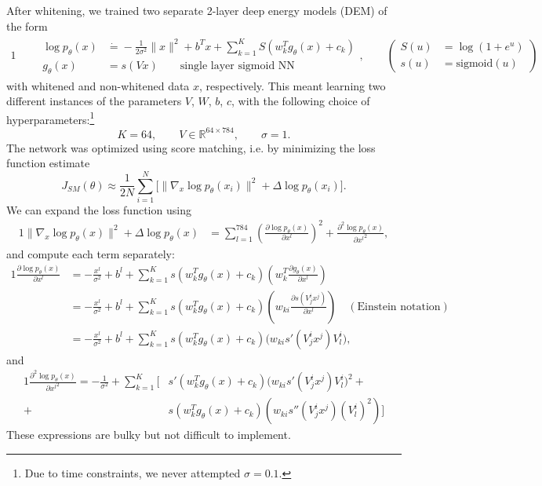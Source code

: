 \documentclass[a4paper]{article}
\theoremstyle{definition}
\theoremstyle{plain}
\begin{document}
After whitening, we trained two separate 2-layer deep energy models (DEM) of the form
\begin{alignat*}{1}
\qquad \begin{aligned}\log p_\theta(x) &\dot{=}-\frac{1}{2\sigma^2} \|x\|^2 + b^T x + \sum_{k=1}^K S(w_k^T g_\theta(x) + c_k)\\
g_\theta(x) &= s(Vx) \qquad \text{single layer sigmoid NN}\end{aligned}, \qquad \left(\begin{aligned} S(u) &= \log(1 + e^u)\\ s(u) &= \text{sigmoid}(u)\end{aligned} \right)
\end{alignat*}
with whitened and non-whitened data $x$, respectively. This meant learning two different instances of the parameters $V$, $W$, $b$, $c$, with the following choice of hyperparameters:\footnote{Due to time constraints, we never attempted $\sigma = 0.1$.}
$$K = 64, \qquad V \in \mathbb{R}^{64\times 784}, \qquad \sigma = 1.$$
The network was optimized using score matching, i.e. by minimizing the loss function estimate
$$J_{SM}(\theta) \approx \frac{1}{2N} \sum_{i=1}^N \Big[ \| \nabla_x \log p_\theta(x_i)\|^2 + \Delta \log p_\theta(x_i)\Big].$$
We can expand the loss function using
\begin{alignat*}{1}
\| \nabla_x \log p_\theta(x)\|^2 + \Delta \log p_\theta(x) &= \sum_{l=1}^{784} \left( \frac{\partial \log p_\theta(x)}{\partial x^l}\right)^2 + \frac{\partial^2 \log p_\theta(x)}{\partial {x^l}^2},
\end{alignat*}
and compute each term separately:
\begin{alignat*}{1}
\frac{\partial \log p_\theta(x) }{\partial x^l} &= -\frac{x^l}{\sigma^2} + b^l + \sum_{k=1}^K s(w_k^T g_\theta(x) + c_k) \left( w_k^T \frac{\partial g_\theta(x)}{\partial x^l} \right)\\
&= -\frac{x^l}{\sigma^2} + b^l + \sum_{k=1}^K s(w_k^T g_\theta(x) + c_k) \left(  w_{ki} \frac{\partial s\left(V_j^i x^j\right)}{\partial x^l} \right) \quad (\text{Einstein notation})\\
&=  -\frac{x^l}{\sigma^2} + b^l + \sum_{k=1}^K s(w_k^T g_\theta(x) + c_k) \Big( w_{ki} s'(V_j^i x^j ) V_l^i\Big), 
\end{alignat*}
 and
\begin{alignat*}{1}
\frac{\partial^2 \log p_\theta(x)}{\partial {x^l}^2} = -\frac{1}{\sigma^2} +  \sum_{k=1}^K \Bigg[ &s'(w_k^T g_\theta(x) + c_k) \Big( w_{ki} s'(V_ j^i x^j ) V_l^i\Big)^2 +\\
+ \  &s(w_k^T g_\theta(x) + c_k)  \left( w_{ki} s''\left( V_j^i x^j \right) \left(V_l^i\right)^2 \right)\Bigg]
\end{alignat*}
These expressions are bulky but not difficult to implement.
\end{document}
